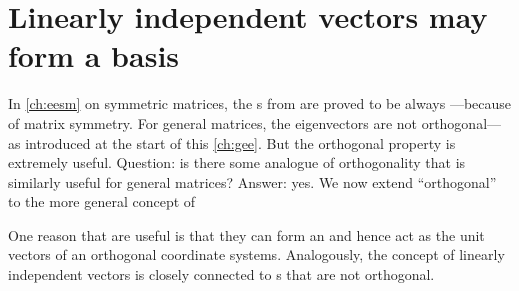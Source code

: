 
\section{Linearly independent vectors may form a basis}
\label{sec:lisb}

\secttoc
\begin{comment}
\pooliv{p.92--7,198--208} \holti{\S2.3}
\end{comment}



In \cref{ch:eesm} on symmetric matrices, the s from  are proved to be always ---because of matrix symmetry.  
For general matrices, the eigenvectors are not orthogonal---as introduced at the start of this \cref{ch:gee}.  
But the orthogonal property is extremely useful.
Question: is there some analogue of orthogonality that is similarly useful for general matrices?
Answer: yes. 
We now extend ``orthogonal'' to the more general concept of 

One reason that  are useful is that they can form an  and hence act as the unit vectors of an orthogonal coordinate systems.
Analogously, the concept of linearly independent vectors is closely connected to s that are not orthogonal.




